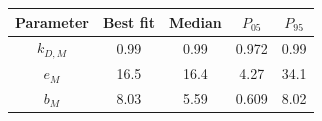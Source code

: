 \begin{tabular}{ccccc}
\toprule
Parameter & Best fit & Median & $P_{05}$ & $P_{95}$\\
\midrule
$k_{D,M}$ & 0.99 & 0.99 & 0.972 & 0.99\\
$e_M$ & 16.5 & 16.4 & 4.27 & 34.1\\
$b_M$ & 8.03 & 5.59 & 0.609 & 8.02\\
\bottomrule
\end{tabular}
